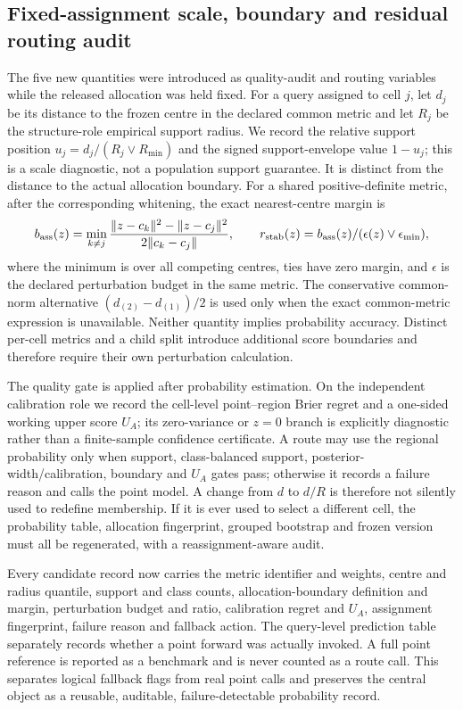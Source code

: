 \documentclass[11pt,a4paper]{article}
\numberwithin{equation}{section}
\theoremstyle{definition}\newtheorem{definition}[theorem]{Definition}
\theoremstyle{remark}\newtheorem{remark}[theorem]{Remark}
\begin{document}
\subsection{Fixed-assignment scale, boundary and residual routing audit}
\label{sec:fixedscaleaudit}
The five new quantities were introduced as quality-audit and routing variables while the released allocation was held fixed. For a query assigned to cell $j$, let $d_j$ be its distance to the frozen centre in the declared common metric and let $R_j$ be the structure-role empirical support radius. We record the relative support position $u_j=d_j/(R_j\vee R_{\min})$ and the signed support-envelope value $1-u_j$; this is a scale diagnostic, not a population support guarantee. It is distinct from the distance to the actual allocation boundary. For a shared positive-definite metric, after the corresponding whitening, the exact nearest-centre margin is
\[
b_{\rm ass}(z)=\min_{k\ne j}
 \frac{\|z-c_k\|^2-\|z-c_j\|^2}{2\|c_k-c_j\|},
\qquad
r_{\rm stab}(z)=b_{\rm ass}(z)/(\epsilon(z)\vee\epsilon_{\min}),
\]
where the minimum is over all competing centres, ties have zero margin, and $\epsilon$ is the declared perturbation budget in the same metric. The conservative common-norm alternative $(d_{(2)}-d_{(1)})/2$ is used only when the exact common-metric expression is unavailable. Neither quantity implies probability accuracy. Distinct per-cell metrics and a child split introduce additional score boundaries and therefore require their own perturbation calculation.

The quality gate is applied after probability estimation. On the independent calibration role we record the cell-level point--region Brier regret and a one-sided working upper score $U_A$; its zero-variance or $z=0$ branch is explicitly diagnostic rather than a finite-sample confidence certificate. A route may use the regional probability only when support, class-balanced support, posterior-width/calibration, boundary and $U_A$ gates pass; otherwise it records a failure reason and calls the point model. A change from $d$ to $d/R$ is therefore not silently used to redefine membership. If it is ever used to select a different cell, the probability table, allocation fingerprint, grouped bootstrap and frozen version must all be regenerated, with a reassignment-aware audit.

Every candidate record now carries the metric identifier and weights, centre and radius quantile, support and class counts, allocation-boundary definition and margin, perturbation budget and ratio, calibration regret and $U_A$, assignment fingerprint, failure reason and fallback action. The query-level prediction table separately records whether a point forward was actually invoked. A full point reference is reported as a benchmark and is never counted as a route call. This separates logical fallback flags from real point calls and preserves the central object as a reusable, auditable, failure-detectable probability record.
\end{document}
